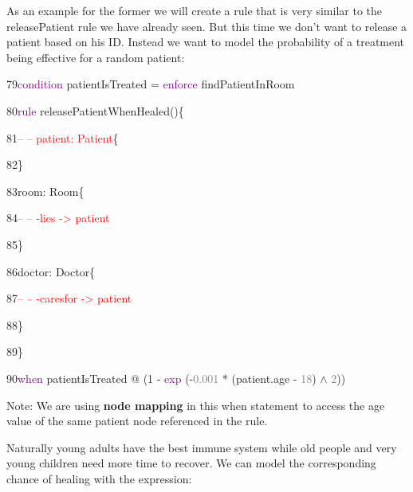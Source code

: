As an example for the former we will create a rule that is very similar to the \textsf{releasePatient} rule we have already seen. But this time we don't want to release a patient based on his ID. Instead we want to model the probability of a treatment being effective for a random patient:\newline

{

79\hspace{0.5cm}\textcolor{Purple}{condition} patientIsTreated = \textcolor{Purple}{enforce} findPatientInRoom 

80\hspace{0.5cm}\textcolor{Purple}{rule} releasePatientWhenHealed()\{

81\hspace{1cm}\textcolor{red}{-- -- patient: Patient}\{

82\hspace{1cm}\}

83\hspace{1cm}room: Room\{

84\hspace{1.5cm}\textcolor{red}{-- -- -lies -> patient}

85\hspace{1cm}\}

86\hspace{1cm}doctor: Doctor\{

87\hspace{1.5cm}\textcolor{red}{-- -- -caresfor -> patient}

88\hspace{1cm}\}

89\hspace{0.5cm}\}

90\hspace{0.5cm}\textcolor{Purple}{when} patientIsTreated @ (1 - \textcolor{Purple}{exp} (-\textcolor{Grey}{0.001} * (patient.age - \textcolor{Grey}{18}) $\wedge$ \textcolor{Grey}{2}))\newline

}
Note: We are using \textbf{node mapping} in this when statement to access the \textsf{age} value of the same patient node referenced in the rule.\newline

Naturally young adults have the best immune system while old people and very young children need more time to recover. We can model the corresponding chance of healing with the expression:

\centering

